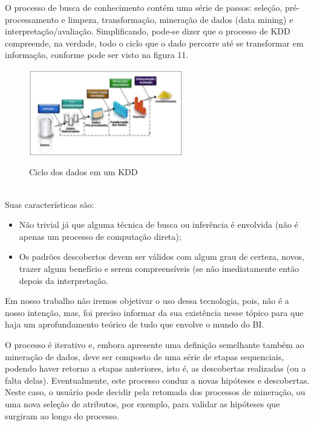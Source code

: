 O processo de busca de conhecimento cont\'{e}m uma s\'{e}rie de passos: sele\c{c}\~{a}o, pr\'{e}-processamento e limpeza, transforma\c{c}\~{a}o, minera\c{c}\~{a}o de dados (data mining) e interpreta\c{c}\~{a}o/avalia\c{c}\~{a}o. 
Simplificando, pode-se dizer que o processo de KDD compreende, na verdade, todo o ciclo que o dado percorre at\'{e} se transformar em informa\c{c}\~{a}o, conforme pode ser visto na figura 11.

\begin{figure}[H]
	\vspace*{0,2cm}
    \centering
    \caption{Ciclo dos dados em um KDD}
    \includegraphics[width=0.6\textwidth]{./04-figuras/figura-11}
    \label{fig:ilustfig11}
\end{figure}
\vspace*{-0,9cm}
{\raggedright {}} \\

Suas características s\~{a}o:

\begin{itemize}

    \item Não trivial já que alguma técnica de busca ou inferência é envolvida (não é apenas um processo de computação direta);
    
    \item Os padrões descobertos devem ser válidos com algum grau de certeza, novos, trazer algum benefício e serem compreensíveis (se não imediatamente então depois da interpreta\c{c}\~{a}o.

\end{itemize}

Em nosso trabalho n\~{a}o iremos objetivar o uso dessa tecnologia, pois, n\~{a}o \'{e} a nosso inten\c{c}\~{a}o, mas, foi preciso informar da sua existência nesse tópico para que haja um aprofundamento teórico de tudo que envolve o mundo do BI. 

O processo \'{e} iterativo e, embora apresente uma defini\c{c}\~{a}o semelhante tamb\'{e}m ao minera\c{c}\~{a}o de dados, deve ser composto de uma s\'{e}rie de etapas sequenciais, podendo haver retorno a etapas anteriores, isto \'{e}, as descobertas realizadas (ou a falta delas). Eventualmente, este processo conduz a novas hipóteses e descobertas. Neste caso, o usu\'{a}rio pode decidir pela retomada dos processos de minera\c{c}\~{a}o, ou uma nova sele\c{c}\~{a}o de atributos, por exemplo, para validar as hipóteses que surgiram ao longo do processo.

